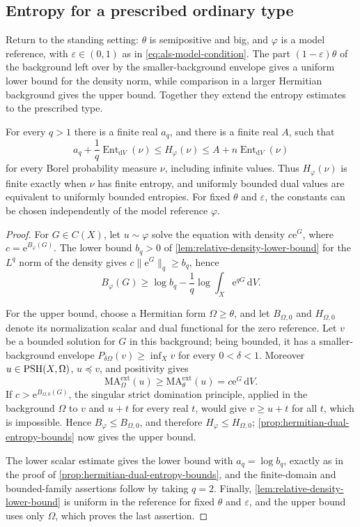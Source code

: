 \subsection{Entropy for a prescribed ordinary type}

Return to the standing setting: $\theta$ is semipositive and big, and $\varphi$ is a model reference, with $\varepsilon\in(0,1)$ as in \eqref{eq:als-model-condition}. The part $(1-\varepsilon)\theta$ of the background left over by the smaller-background envelope gives a uniform lower bound for the density norm, while comparison in a larger Hermitian background gives the upper bound. Together they extend the entropy estimates to the prescribed type.

\begin{corollary}\label{cor:prescribed-dual-entropy}
For every $q>1$ there is a finite real $a_q$, and there is a finite real $A$, such that
\[
 a_q+\frac1q\operatorname{Ent}_{\mathrm{d}V}(\nu)
 \leq H_\varphi(\nu)
 \leq A+n\operatorname{Ent}_{\mathrm{d}V}(\nu)
\]
for every Borel probability measure $\nu$, including infinite values. Thus $H_\varphi(\nu)$ is finite exactly when $\nu$ has finite entropy, and uniformly bounded dual values are equivalent to uniformly bounded entropies. For fixed $\theta$ and $\varepsilon$, the constants can be chosen independently of the model reference $\varphi$.
\end{corollary}
\begin{proof}
For $G\in C(X)$, let $u\sim\varphi$ solve the equation with density $c\mathrm{e}^G$, where $c=\mathrm{e}^{B_\varphi(G)}$. The lower bound $b_q>0$ of \cref{lem:relative-density-lower-bound} for the $L^q$ norm of the density gives $c\|\mathrm{e}^G\|_q\geq b_q$, hence
\[
 B_\varphi(G)\geq\log b_q-\frac1q
                         \log\int_X\mathrm{e}^{qG}\,\mathrm{d}V.
\]

For the upper bound, choose a Hermitian form $\Omega\geq\theta$, and let $B_{\Omega,0}$ and $H_{\Omega,0}$ denote its normalization scalar and dual functional for the zero reference. Let $v$ be a bounded solution for $G$ in this background; being bounded, it has a smaller-background envelope $P_{\delta\Omega}(v)\geq\inf_Xv$ for every $0<\delta<1$. Moreover $u\in\mathrm{PSH}(X,\Omega)$, $u\preceq v$, and positivity gives
\[
 \mathrm{MA}^{\mathrm{ext}}_\Omega(u)
       \geq\mathrm{MA}^{\mathrm{ext}}_\theta(u)
       =c\mathrm{e}^G\,\mathrm{d}V.
\]
If $c>\mathrm{e}^{B_{\Omega,0}(G)}$, the singular strict domination principle, applied in the background $\Omega$ to $v$ and $u+t$ for every real $t$, would give $v\geq u+t$ for all $t$, which is impossible. Hence $B_\varphi\leq B_{\Omega,0}$, and therefore $H_\varphi\leq H_{\Omega,0}$; \cref{prop:hermitian-dual-entropy-bounds} now gives the upper bound.

The lower scalar estimate gives the lower bound with $a_q=\log b_q$, exactly as in the proof of \cref{prop:hermitian-dual-entropy-bounds}, and the finite-domain and bounded-family assertions follow by taking $q=2$. Finally, \cref{lem:relative-density-lower-bound} is uniform in the reference for fixed $\theta$ and $\varepsilon$, and the upper bound uses only $\Omega$, which proves the last assertion.
\end{proof}

